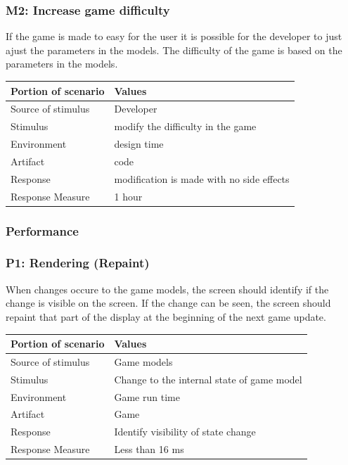 \subsubsection* {M2: Increase game difficulty}
If the game is made to easy for the user it is possible for the developer to just ajust the
parameters in the models. The difficulty of the game is based on the parameters
in the models. 

\begin{tabular}{| l | l |}
	\hline
	{\bf Portion of scenario} & {\bf Values} \\ \hline
	Source of stimulus & Developer\\ \hline
	Stimulus & modify the difficulty in the game\\ \hline
	Environment & design time \\ \hline
	Artifact & code \\ \hline
	Response & modification is made with no side effects\\ \hline
	Response Measure & 1 hour\\ \hline
\end{tabular}

\subsubsection{Performance}

\subsubsection*{P1: Rendering (Repaint)}
When changes occure to the game models, the screen should identify if the change 
is visible on the screen. If the change can be seen, the screen should repaint 
that part of the display at the beginning of the next game update.

\begin{tabular}{| l | l |}
	\hline
	{\bf Portion of scenario} & {\bf Values} \\ \hline
	Source of stimulus & Game models\\ \hline
	Stimulus & Change to the internal state of game model\\ \hline
	Environment & Game run time \\ \hline
	Artifact &  Game \\ \hline
	Response & Identify visibility of state change\\ \hline
	Response Measure & Less than 16 ms\\ \hline
\end{tabular}

